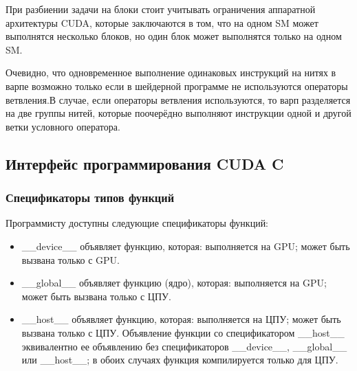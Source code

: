 \documentclass[a4paper, 12pt]{article}
\begin{document}
    При разбиении задачи на блоки стоит учитывать ограничения аппаратной архитектуры CUDA, которые заключаются в том, что на одном SM может выполнятся несколько блоков, но один блок может выполнятся только на одном SM.
    
    Очевидно, что одновременное выполнение одинаковых инструкций на нитях в варпе возможно только если в шейдерной программе не используются операторы ветвления.В случае, если операторы ветвления используются, то варп разделяется на две группы нитей, которые поочерёдно выполняют инструкции одной и другой ветки условного оператора.

    \subsection{Интерфейс программирования CUDA C}
     \subsubsection{Спецификаторы типов функций} 
     Программисту доступны следующие спецификаторы функций:

\begin{itemize}
    \item  \_\_device\_\_ объявляет функцию, которая: выполняется на GPU; может быть вызвана только с GPU.
    \item \_\_global\_\_ объявляет функцию (ядро), которая: выполняется на GPU; может быть вызвана только с ЦПУ.
    \item \_\_host\_\_ объявляет функцию, которая: выполняется на ЦПУ; может быть вызвана только с ЦПУ. Объявление функции со спецификатором \_\_host\_\_ эквивалентно ее объявлению без спецификаторов \_\_device\_\_, \_\_global\_\_ или \_\_host\_\_; в обоих случаях функция компилируется только для ЦПУ.
\end{itemize}
\end{document}
